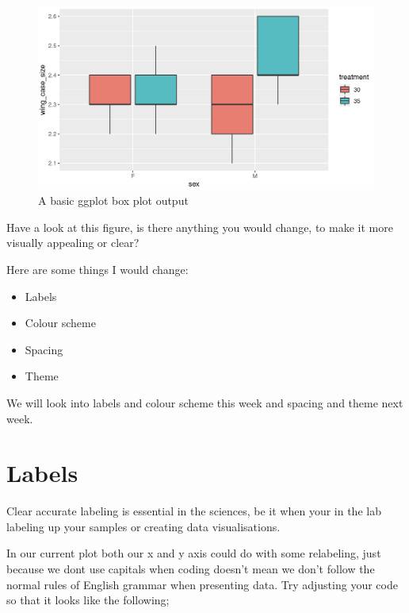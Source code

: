 \documentclass[
]{book}
\providecommand{\tightlist}{%
  \setlength{\itemsep}{0pt}\setlength{\parskip}{0pt}}
\begin{document}
\begin{figure}
\includegraphics[width=0.9\linewidth]{figures/screenshot_deconstructingaplot_2} \caption{A basic ggplot box plot output}\label{fig:unnamed-chunk-52}
\end{figure}

Have a look at this figure, is there anything you would change, to make it more visually appealing or clear?

Here are some things I would change:

\begin{itemize}
\tightlist
\item
  Labels
\item
  Colour scheme
\item
  Spacing
\item
  Theme
\end{itemize}

We will look into labels and colour scheme this week and spacing and theme next week.

\hypertarget{labels}{%
\section{Labels}\label{labels}}

Clear accurate labeling is essential in the sciences, be it when your in the lab labeling up your samples or creating data visualisations.

In our current plot both our x and y axis could do with some relabeling, just because we dont use capitals when coding doesn't mean we don't follow the normal rules of English grammar when presenting data. Try adjusting your code so that it looks like the following;
\end{document}

